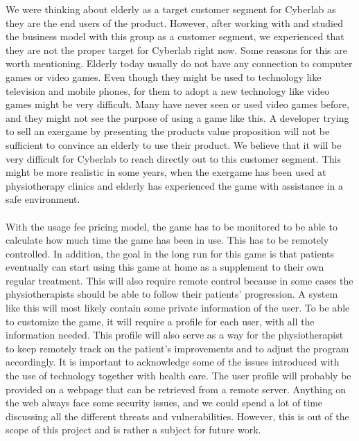 We were thinking about elderly as a target customer segment for Cyberlab as they are the end users of the product. However, after working with and studied the business model with this group as a customer segment, we experienced that they are not the proper target for Cyberlab right now. Some reasons for this are worth mentioning. Elderly today usually do not have any connection to computer games or video games. Even though they might be used to technology like television and mobile phones, for them to adopt a new technology like video games might be very difficult. Many have never seen or used video games before, and they might not see the purpose of using a game like this. A developer trying to sell an exergame by presenting the products value proposition will not be sufficient to convince an elderly to use their product. We believe that it will be very difficult for Cyberlab to reach directly out to this customer segment. This might be more realistic in some years, when the exergame has been used at physiotherapy clinics and elderly has experienced the game with assistance in a safe environment.\\ \\
With the usage fee pricing model, the game has to be monitored to be able to calculate how much time the game has been in use. This has to be remotely controlled. In addition, the goal in the long run for this game is that patients eventually can start using this game at home as a supplement to their own regular treatment. This will also require remote control because in some cases the physiotherapists should be able to follow their patients’ progression. A system like this will most likely contain some private information of the user. To be able to customize the game, it will require a profile for each user, with all the information needed. This profile will also serve as a way for the physiotherapist to keep remotely track on the patient’s improvements and to adjust the program accordingly. It is important to acknowledge some of the issues introduced with the use of technology together with health care. The user profile will probably be provided on a webpage that can be retrieved from a remote server. Anything on the web always face some security issues, and we could spend a lot of time discussing all the different threats and vulnerabilities. However, this is out of the scope of this project and is rather a subject for future work. \\ \\ 
